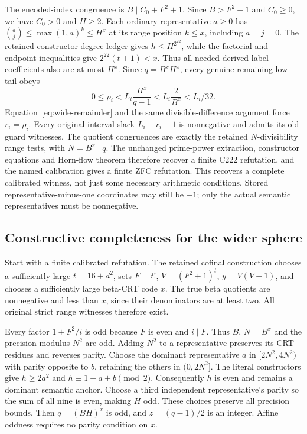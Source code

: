 The encoded-index congruence is $B\mid C_0+F^2+1$.
Since $B>F^2+1$ and $C_0\ge0$, we have $C_0>0$ and $H\ge2$.
Each ordinary representative $a\ge0$ has
$\binom aj\le\max(1,a)^k\le H^x$ at its range position $k\le x$,
including $a=j=0$. The retained constructor degree ledger gives
$h\le H^{2^{22}}$, while the factorial and endpoint inequalities give
$2^{22}(t+1)<x$. Thus all needed derived-label coefficients also are
at most $H^x$. Since $q=B^xH^x$, every genuine remaining low tail obeys
\[
 0\le\rho_i<L_i\frac{H^x}{q-1}
              <L_i\frac2{B^x}<L_i/32.
\]
Equation~\eqref{eq:wide-remainder} and the same divisible-difference
argument force $r_i=\rho_i$. Every original interval slack
$L_i-r_i-1$ is nonnegative and admits its old guard witnesses.
The quotient congruences are exactly the retained $N$-divisibility range
tests, with $N=B^x\mid q$. The unchanged prime-power extraction,
constructor equations and Horn-flow theorem therefore recover a finite
C222 refutation, and the named calibration gives a finite ZFC refutation.
This recovers a complete calibrated witness, not just some necessary
arithmetic conditions. Stored representative-minus-one coordinates may
still be $-1$; only the actual semantic representatives must be nonnegative.

\subsection{Constructive completeness for the wider sphere}
Start with a finite calibrated refutation. The retained cofinal construction
chooses a sufficiently large $t=16+d^2$, sets $F=t!$,
$V=(F^2+1)^t$, $y=V(V-1)$, and chooses a sufficiently large beta-CRT
code $x$. The true beta quotients are nonnegative and less than $x$,
since their denominators are at least two. All original strict range
witnesses therefore exist.

Every factor $1+F^2/i$ is odd because $F$ is even and $i\mid F$.
Thus $B$, $N=B^x$ and the precision modulus $N^2$ are odd. Adding
$N^2$ to a representative preserves its CRT residues and reverses parity.
Choose the dominant representative $a$ in $[2N^2,4N^2)$ with parity
opposite to $b$, retaining the others in $(0,2N^2]$. The literal
constructors give $h\ge2a^2$ and $h\equiv1+a+b\pmod2$.
Consequently $h$ is even and remains a dominant semantic anchor.
Choose a third independent representative's parity so the sum of all
nine is even, making $H$ odd. These choices preserve all precision
bounds. Then $q=(BH)^x$ is odd, and $z=(q-1)/2$ is an integer.
Affine oddness requires no parity condition on $x$.

